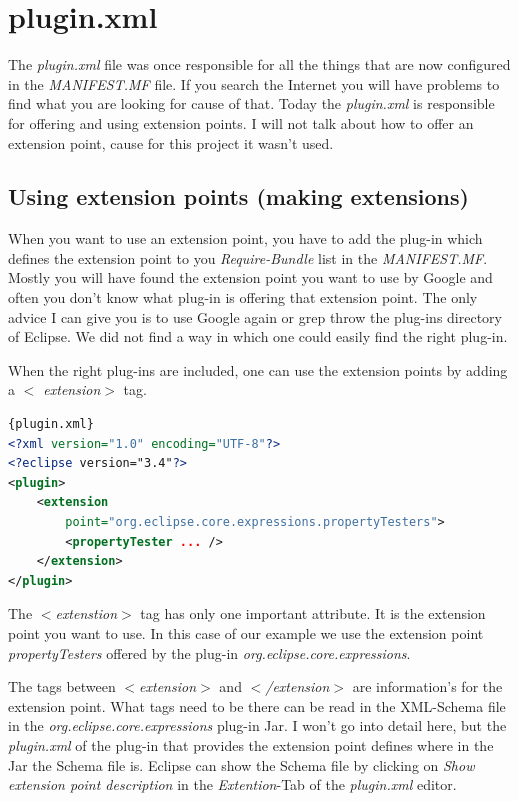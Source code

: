 \documentclass[a4paper,10pt]{report}
\begin{document}
\section{plugin.xml}
The {\it plugin.xml} file was once responsible for all the things that are now configured in the {\it MANIFEST.MF} file. If you search the Internet you will have problems to find what you are looking for cause of that. Today the {\it plugin.xml} is responsible for offering and using extension points. I will not talk about how to offer an extension point, cause for this project it wasn't used.

\subsection{Using extension points (making extensions)}
When you want to use an extension point, you have to add the plug-in which defines the extension point to you {\it Require-Bundle} list in the {\it MANIFEST.MF}. Mostly you will have found the extension point you want to use by Google and often you don't know what plug-in is offering that extension point. The only advice I can give you is to use Google again or grep throw the plug-ins directory of Eclipse. We did not find a way in which one could easily find the right plug-in.

When the right plug-ins are included, one can use the extension points by adding a {\it $<$ extension$>$} tag.
\begin{lstlisting}[language=XML,caption=Use extenstion point ({\it plugin.xml})]{plugin.xml}
<?xml version="1.0" encoding="UTF-8"?>
<?eclipse version="3.4"?>
<plugin>
 	<extension 
	    point="org.eclipse.core.expressions.propertyTesters">
   		<propertyTester ... />
 	</extension>
</plugin>
\end{lstlisting}

The {\it $<$extenstion$>$} tag has only one important attribute. It is the extension point you want to use. In this case of our example we use the extension point {\it propertyTesters} offered by the plug-in {\it org.eclipse.core.expressions}.

The tags between {\it $<$extension$>$} and {\it $<$/extension$>$} are information's for the extension point. What tags need to be there can be read in the XML-Schema file in the {\it org.eclipse.core.expressions} plug-in Jar. I won't go into detail here, but the {\it plugin.xml} of the plug-in that provides the extension point defines where in the Jar the Schema file is. Eclipse can show the Schema file by clicking on {\it Show extension point description} in the {\it Extention}-Tab of the {\it plugin.xml} editor.
\end{document}
